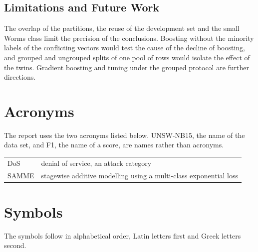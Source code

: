 \documentclass[10pt,conference]{IEEEtran}
\begin{document}
\subsection{Limitations and Future Work}
\label{sec:concl-future}

The overlap of the partitions, the reuse of the development set and the small Worms class limit the precision of the conclusions. Boosting without the minority labels of the conflicting vectors would test the cause of the decline of boosting, and grouped and ungrouped splits of one pool of rows would isolate the effect of the twins. Gradient boosting and tuning under the grouped protocol are further directions.


\raggedbottom

\appendices
\section{Acronyms}
\label{app:acronyms}
The report uses the two acronyms listed below. UNSW-NB15, the name of the data set, and F1, the name of a score, are names rather than acronyms.

\smallskip
\noindent
\begin{tabular}{@{}lp{}@{}}
DoS & denial of service, an attack category \\
SAMME & stagewise additive modelling using a multi-class exponential loss \\
\end{tabular}

\section{Symbols}
\label{app:symbols}
The symbols follow in alphabetical order, Latin letters first and Greek letters second.
\end{document}
